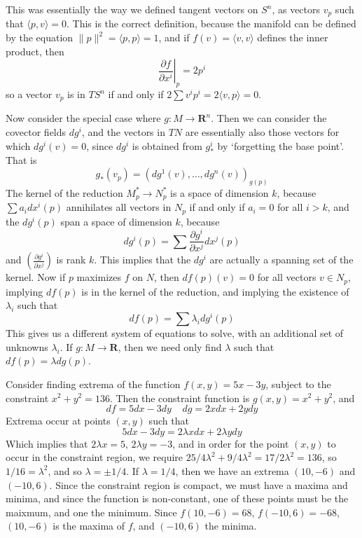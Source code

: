 This was essentially the way we defined tangent vectors on $S^n$, as vectors $v_p$ such that $\langle p, v \rangle = 0$. This is the correct definition, because the manifold can be defined by the equation $\| p \|^2 = \langle p, p \rangle = 1$, and if $f(v) = \langle v, v \rangle$ defines the inner product, then
%
\[ \left. \frac{\partial f}{\partial x^i} \right|_p = 2p^i \]
%
so a vector $v_p$ is in $TS^n$ if and only if $2 \sum v^i p^i = 2 \langle v, p \rangle = 0$.

Now consider the special case where $g: M \to \mathbf{R}^n$. Then we can consider the covector fields $dg^i$, and the vectors in $TN$ are essentially also those vectors for which $dg^i(v) = 0$, since $dg^i$ is obtained from $g^i_*$ by `forgetting the base point'. That is
%
\[ g_*(v_p) = (dg^1(v), \dots, dg^n(v))_{g(p)} \]
%
The kernel of the reduction $M^*_p \to N^*_p$ is a space of dimension $k$, because $\sum a_i dx^i(p)$ annihilates all vectors in $N_p$ if and only if $a_i = 0$ for all $i > k$, and the $dg^i(p)$ span a space of dimension $k$, because
%
\[ dg^i(p) = \sum \frac{\partial g^i}{\partial x^j} dx^j(p) \]
%
and $\left( \frac{\partial g^i}{\partial x^j} \right)$ is rank $k$. This implies that the $dg^i$ are actually a spanning set of the kernel. Now if $p$ maximizes $f$ on $N$, then $df(p)(v) = 0$ for all vectors $v \in N_p$, implying $df(p)$ is in the kernel of the reduction, and implying the existence of $\lambda_i$ such that
%
\[ df(p) = \sum \lambda_i dg^i(p) \]
%
This gives us a different system of equations to solve, with an additional set of unknowns $\lambda_i$. If $g: M \to \mathbf{R}$, then we need only find $\lambda$ such that $df(p) = \lambda dg(p)$.

\begin{example}
    Consider finding extrema of the function $f(x,y) = 5x - 3y$, subject to the constraint $x^2 + y^2 = 136$. Then the constraint function is $g(x,y) = x^2 + y^2$, and
    \[ df = 5dx - 3dy\ \ \ \ \ dg = 2x dx + 2y dy \]
    Extrema occur at points $(x,y)$ such that
    \[ 5dx - 3dy = 2 \lambda x dx + 2 \lambda y dy \]
    Which implies that $2 \lambda x = 5$, $2 \lambda y = -3$, and in order for the point $(x,y)$ to occur in the constraint region, we require $25/4 \lambda^2 + 9/4 \lambda^2 = 17/2\lambda^2 = 136$, so $1/16 = \lambda^2$, and so $\lambda = \pm 1/4$. If $\lambda = 1/4$, then we have an extrema $(10, -6)$ and $(-10, 6)$. Since the constraint region is compact, we must have a maxima and minima, and since the function is non-constant, one of these points must be the maixmum, and one the minimum. Since $f(10,-6) = 68$, $f(-10,6) = -68$, $(10,-6)$ is the maxima of $f$, and $(-10,6)$ the minima.
\end{example}


